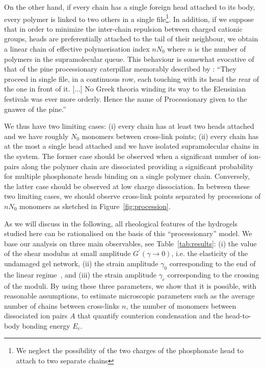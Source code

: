 \documentclass[twoside,twocolumn,9pt]{article}
\begin{document}
On the other hand, if every chain has a single foreign head attached to its body, every polymer is linked to two others in a single file\footnote[3]{We neglect the possibility of the two charges of the phosphonate head to attach to two separate chains}. In addition, if we suppose that in order to minimize the inter-chain repulsion between charged cationic groups, heads are preferentially attached to the tail of their neighbour, we obtain a linear chain of effective polymerisation index $n N_0$ where $n$ is the number of polymers in the supramolecular queue. This behaviour is somewhat evocative of that of the pine processionary caterpillar memorably described by \citet{Fabre1916}: 
``They proceed in single file, in a continuous row, each touching with its head the rear of the one in front of it. [...] No Greek theoria winding its way to the Eleusinian festivals was ever more orderly. Hence the name of Processionary given to the gnawer of the pine.''



We thus have two limiting cases: (i) every chain has at least two heads attached and we have roughly $N_0$ monomers between cross-link points; (ii) every chain has at the most a single head attached and we have isolated supramolecular chains in the system. The former case should be observed when a significant number of ion-pairs along the polymer chain are dissociated providing a significant probability for multiple phosphonate heads binding on a single polymer chain. Conversely, the latter case should be observed at low charge dissociation. In between these two limiting cases, we should observe cross-link points separated by processions of $n N_0$ monomers as sketched in Figure~\ref{fig:procession}.

As we will discuss in the following, all rheological features of the hydrogels studied here can  be rationalised on the basis of this ``processionary'' model. We base our analysis on three main observables, see Table~\ref{tab:results}: (i) the value of the shear modulus at small amplitude $G^\prime(\gamma\rightarrow 0)$, i.e. the elasticity of the undamaged gel network, (ii) the strain amplitude $\gamma_0$ corresponding to the end of the linear regime~\cite{Hyun2011}, and (iii) the strain amplitude $\gamma_c$ corresponding to the crossing of the moduli. By using these three parameters, we show that it is possible, with reasonable assumptions, to estimate microscopic parameters such as the average number of chains between cross-links $n$, the number of monomers between dissociated ion pairs $A$ that quantify counterion condensation and the head-to-body bonding energy $E_c$.
\end{document}
